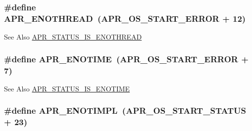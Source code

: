 \hypertarget{group___a_p_r___error_ga7b43e1e075ff031e142aa809295ee441}{
\subsubsection[{A\-P\-R\-\_\-\-E\-N\-O\-T\-H\-R\-E\-A\-D}]{\setlength{\rightskip}{0pt plus 5cm}\#define A\-P\-R\-\_\-\-E\-N\-O\-T\-H\-R\-E\-A\-D~({\bf A\-P\-R\-\_\-\-O\-S\-\_\-\-S\-T\-A\-R\-T\-\_\-\-E\-R\-R\-O\-R} + 12)}}\label{group___a_p_r___error_ga7b43e1e075ff031e142aa809295ee441}
\begin{DoxySeeAlso}{See Also}
\hyperlink{group___a_p_r___s_t_a_t_u_s___i_s_gaf33e51e4df639e2b93c99a2fa8b5c7e7}{A\-P\-R\-\_\-\-S\-T\-A\-T\-U\-S\-\_\-\-I\-S\-\_\-\-E\-N\-O\-T\-H\-R\-E\-A\-D} 
\end{DoxySeeAlso}
\hypertarget{group___a_p_r___error_ga7acfb436774a21ae93ff5c1b89e7c4f5}{
\subsubsection[{A\-P\-R\-\_\-\-E\-N\-O\-T\-I\-M\-E}]{\setlength{\rightskip}{0pt plus 5cm}\#define A\-P\-R\-\_\-\-E\-N\-O\-T\-I\-M\-E~({\bf A\-P\-R\-\_\-\-O\-S\-\_\-\-S\-T\-A\-R\-T\-\_\-\-E\-R\-R\-O\-R} + 7)}}\label{group___a_p_r___error_ga7acfb436774a21ae93ff5c1b89e7c4f5}
\begin{DoxySeeAlso}{See Also}
\hyperlink{group___a_p_r___s_t_a_t_u_s___i_s_ga65cb54d0b5902784037626841e26e709}{A\-P\-R\-\_\-\-S\-T\-A\-T\-U\-S\-\_\-\-I\-S\-\_\-\-E\-N\-O\-T\-I\-M\-E} 
\end{DoxySeeAlso}
\hypertarget{group___a_p_r___error_ga939ddb834a30bc9a5a0a329b13000161}{
\subsubsection[{A\-P\-R\-\_\-\-E\-N\-O\-T\-I\-M\-P\-L}]{\setlength{\rightskip}{0pt plus 5cm}\#define A\-P\-R\-\_\-\-E\-N\-O\-T\-I\-M\-P\-L~({\bf A\-P\-R\-\_\-\-O\-S\-\_\-\-S\-T\-A\-R\-T\-\_\-\-S\-T\-A\-T\-U\-S} + 23)}}\label{group___a_p_r___error_ga939ddb834a30bc9a5a0a329b13000161}
